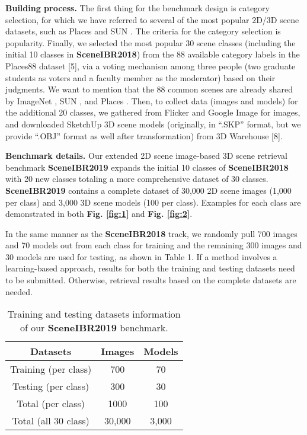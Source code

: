 \documentclass[../main.tex]{subfiles}
\begin{document}
\textbf{Building process.} The first thing for the benchmark design is category selection, for which we have referred to several of the most popular 2D/3D scene datasets, such as Places \cite{zhou2017places} and SUN \cite{SUN}. The criteria for the category selection is popularity. Finally, we selected the most popular 30 scene classes (including the initial 10 classes in \textbf{SceneIBR2018}) from the 88 available category labels in the Places88 dataset [5], via a voting mechanism among three people (two graduate students as voters and a faculty member as the moderator) based on their judgments. We want to mention that the 88 common scenes are already shared by ImageNet \cite{ImageNet}, SUN \cite{SUN}, and Places \cite{zhou2017places}. Then, to collect data (images and models) for the additional 20 classes, we gathered from Flicker and Google Image for images, and downloaded SketchUp 3D scene models (originally, in “.SKP” format, but we provide “.OBJ” format as well after transformation) from 3D Warehouse [8].

\textbf{Benchmark details.} Our extended 2D scene image-based 3D scene retrieval benchmark \textbf{SceneIBR2019} expands the initial 10 classes of \textbf{SceneIBR2018} with 20 new classes totaling a more comprehensive dataset of 30 classes. \textbf{SceneIBR2019} contains a complete dataset of 30,000 2D scene images (1,000 per class) and 3,000 3D scene models (100 per class). Examples for each class are demonstrated in both \textbf{Fig. \ref{fig:1}} and \textbf{Fig. \ref{fig:2}}.

In the same manner as the \textbf{SceneIBR2018} track, we randomly pull 700 images and 70 models out from each class for training and the remaining 300 images and 30 models are used for testing, as shown in Table 1. If a method involves a learning-based approach, results for both the training and testing datasets need to be submitted. Otherwise, retrieval results based on the complete datasets are needed.


\begin{table}[h]
	\centering
	\caption{Training and testing datasets information of our \textbf{SceneIBR2019} benchmark.}
	\begin{center}
		\begin{tabular}  {|c|c|c|}
			\hline
			\textbf{\normalsize{Datasets}} & \textbf{\normalsize{Images}} & \textbf{\normalsize{Models}}\\
			\hline
			\normalsize{Training (per class)}  & 700  & 70  \\
			\hline
			\normalsize{Testing (per class)}  & 300  & 30  \\
			\hline
			\normalsize{Total (per class)}  & 1000  & 100  \\
			\hline
			\normalsize{Total (all 30 class)}  & 30,000  & 3,000  \\
			\hline
		\end{tabular}
	\end{center}
	\label{table1}
\end{table}
\end{document}
